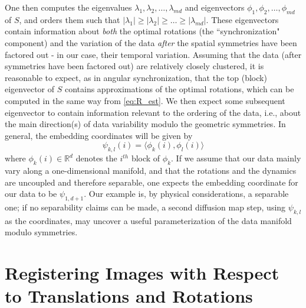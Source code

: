 \documentclass{pnastwo}
\begin{document}
\begin{article}
\begin{materials}
One then computes the eigenvalues $\lambda_1, \lambda_2, \dots, \lambda_{md}$ and eigenvectors $\phi_1, \phi_2, \dots, \phi_{md}$ of $S$, and orders them such that $|\lambda_1| \ge |\lambda_2| \ge \dots \ge |\lambda_{md}|$.
%
These eigenvectors contain information about {\em both} the optimal rotations (the ``synchronization" component) and the
variation of the data {\em after} the spatial symmetries have been factored out - in our case, their temporal variation.
%
Assuming that the data (after symmetries have been factored out) are relatively closely clustered, it is reasonable
to expect, as in angular synchronization, that the top (block) eigenvector of $S$ contains approximations of the optimal rotations,
which can be computed in the same way from \eqref{eq:R_est}.
%
We then expect some subsequent eigenvector to contain information relevant to the ordering of the data,
i.e., about the main direction(s) of data variability modulo the geometric symmetries.
%
In general, the embedding coordinates will be given by
\begin{equation}
\psi_{k,l} (i) = \langle \phi_k(i), \phi_l(i) \rangle
\end{equation}
where $\phi_k(i) \in \mathbb{R}^d$ denotes the $i^{th}$ block of $\phi_k$.
%
If we assume that our data mainly vary along a one-dimensional manifold, and that the rotations and the dynamics are uncoupled and therefore separable, one expects the embedding coordinate for our data %
to be  $\psi_{1,d+1}$.
%
Our example is, by physical considerations, a separable one; if no separability claims can be made, a second diffusion map step, using $\psi_{k,l}$ as the coordinates, may uncover a
useful parameterization of the data manifold modulo symmetries.

\section{Registering Images with Respect to Translations and Rotations} \label{subsec:trans_rot_register}


\end{materials}
\end{article}
\end{document}
